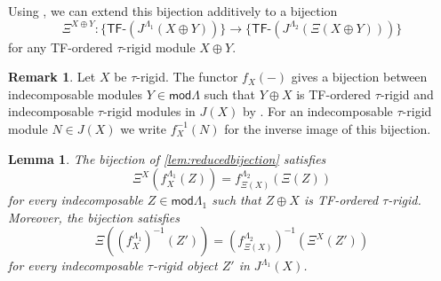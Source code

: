 \documentclass[11pt]{amsart}
\newcommand{\mods}{\mathsf{mod}}
\newcommand{\tfo}[1]{\ensuremath{\mathsf{TF}\text{-} #1}}
\newtheorem{lemma}[theorem]{Lemma}
\theoremstyle{definition}
\newtheorem{remark}[theorem]{Remark}
\begin{document}
Using \cite[Thm. 4.3]{BuanMarsh2018}, we can extend this bijection additively to a bijection
\[ \Xi^{X \oplus Y} : \{\tfo{(J^{\Lambda_1}(X \oplus Y))}\} \to \{\tfo{(J^{\Lambda_2}(\Xi(X \oplus Y)))}\} \]
for any TF-ordered $\tau$-rigid module $X \oplus Y$.


\begin{remark}
    Let $X$ be $\tau$-rigid. The functor $f_X(-)$ gives a bijection between indecomposable modules $Y \in \mods \Lambda$ such that $Y \oplus X$ is TF-ordered $\tau$-rigid and indecomposable $\tau$-rigid modules in $J(X)$ by \cite[Prop. 4.5]{BuanMarsh2018}. For an indecomposable $\tau$-rigid module $N \in J(X)$ we write $f_X^{-1}(N)$ for the inverse image of this bijection.  
\end{remark}

\begin{lemma}\label{lem:reductionbijcommutes}
    The bijection of \cref{lem:reducedbijection} satisfies
    \[ \Xi^X ( f_X^{\Lambda_1}(Z)) = f_{\Xi(X)}^{\Lambda_2}( \Xi(Z)) \]
    for every indecomposable $Z \in \mods \Lambda_1$ such that $Z \oplus X$ is TF-ordered $\tau$-rigid. Moreover, the bijection satisfies
    \[ \Xi ( (f_X^{\Lambda_1})^{-1}(Z')) = (f_{\Xi(X)}^{\Lambda_2})^{-1} ( \Xi^{X}(Z')) \]
    for every indecomposable $\tau$-rigid object $Z'$ in $J^{\Lambda_1}(X)$.
\end{lemma}
\end{document}
